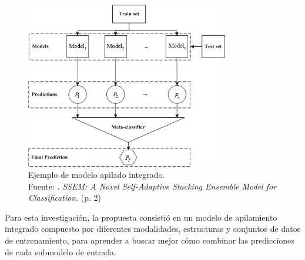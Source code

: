 \begin{itemize}
	\begin{figure}[!ht]
		\begin{center}
			\includegraphics[width=0.79\textwidth]{2/figures/integrated_stacked_model.jpg}
			\caption[Ejemplo de modelo apilado integrado]{Ejemplo de modelo apilado integrado.\\
				Fuente: \cite{tec_jiang2019ensemblemodel}. \textit{SSEM: A Novel Self-Adaptive Stacking Ensemble Model for Classification}. (p. 2)}
			\label{2:fig83}
		\end{center}
	\end{figure}
	
\end{itemize}

Para esta investigación, la propuesta consistió en un modelo de apilamiento integrado compuesto por diferentes modalidades, estructuras y conjuntos de datos de entrenamiento, para aprender a buscar mejor cómo combinar las predicciones de cada submodelo de entrada.

